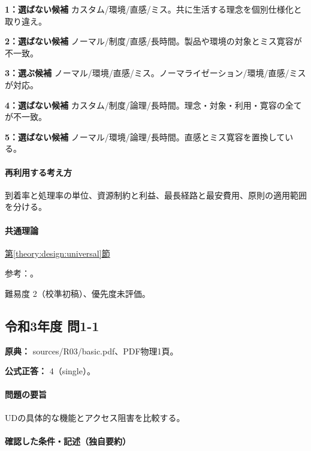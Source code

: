 \noindent\textbf{1：選ばない候補} カスタム/環境/直感/ミス。共に生活する理念を個別仕様化と取り違え。\par

\noindent\textbf{2：選ばない候補} ノーマル/制度/直感/長時間。製品や環境の対象とミス寛容が不一致。\par

\noindent\textbf{3：選ぶ候補} ノーマル/環境/直感/ミス。ノーマライゼーション/環境/直感/ミスが対応。\par

\noindent\textbf{4：選ばない候補} カスタム/制度/論理/長時間。理念・対象・利用・寛容の全てが不一致。\par

\noindent\textbf{5：選ばない候補} ノーマル/環境/論理/長時間。直感とミス寛容を置換している。\par

\paragraph{再利用する考え方} 到着率と処理率の単位、資源制約と利益、最長経路と最安費用、原則の適用範囲を分ける。

\paragraph{共通理論} \hyperref[theory:design:universal]{第\ref*{theory:design:universal}節}

\par 参考：\cite{design48_ud}。

\par 難易度 2（校準初稿）、優先度未評価。

\subsection{令和3年度 問1-1}
\label{q:r03-reg-basic-1-1}

\noindent\textbf{原典：} sources/R03/basic.pdf、PDF物理1頁。

\textbf{公式正答：} 4（single）。

\paragraph{問題の要旨} UDの具体的な機能とアクセス阻害を比較する。

\paragraph{確認した条件・記述（独自要約）}\mbox{}\par

